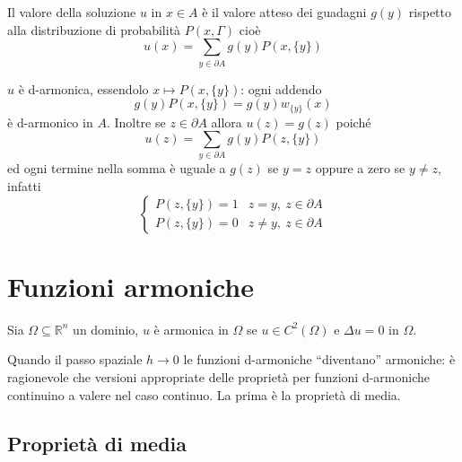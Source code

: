 \documentclass[10pt,a4paper,twoside,openright]{book}
\begin{document}
\begin{theorem}
	Il valore della soluzione $\displaystyle u$ in $\displaystyle x\in A$ è il valore atteso dei guadagni $\displaystyle g(y)$ rispetto alla distribuzione di probabilità $\displaystyle P(x,\Gamma)$ cioè
	\begin{equation*}
		u(x) =\sum _{y\in \partial A} g(y) P(x,\{y\})
	\end{equation*}
\end{theorem}
\begin{dimostrazione}
	$\displaystyle u$ è d-armonica, essendolo $\displaystyle x\longmapsto P(x,\{y\})$: ogni addendo
	\begin{equation*}
		g(y) P(x,\{y\}) =g(y) w_{\{y\}}(x)
	\end{equation*}
	è d-armonico in $\displaystyle A$. Inoltre se $\displaystyle z\in \partial A$ allora $\displaystyle u(z) =g(z)$ poiché
	\begin{equation*}
		u(z) =\sum _{y\in \partial A} g(y) P(z,\{y\})
	\end{equation*}
	ed ogni termine nella somma è uguale a $\displaystyle g(z)$ se $\displaystyle y=z$ oppure a zero se $\displaystyle y\neq z$, infatti
	\begin{equation*}
		\begin{cases}
			P(z,\{y\}) =1 & z=y,\ z\in \partial A     \\
			P(z,\{y\}) =0 & z\neq y,\ z\in \partial A 
		\end{cases}
	\end{equation*}
\end{dimostrazione}
\section{Funzioni armoniche}

Sia $\displaystyle \Omega \subseteq \mathbb{R}^{n}$ un dominio, $\displaystyle u$ è armonica in $\displaystyle \Omega $ se $\displaystyle u\in C^{2}(\Omega)$ e $\displaystyle \Delta u=0$ in $\displaystyle \Omega $. 

Quando il passo spaziale $\displaystyle h\rightarrow 0$ le funzioni d-armoniche ``diventano'' armoniche: è ragionevole che versioni appropriate delle proprietà per funzioni d-armoniche continuino a valere nel caso continuo. La prima è la proprietà di media.
\subsection{Proprietà di media}
\end{document}
